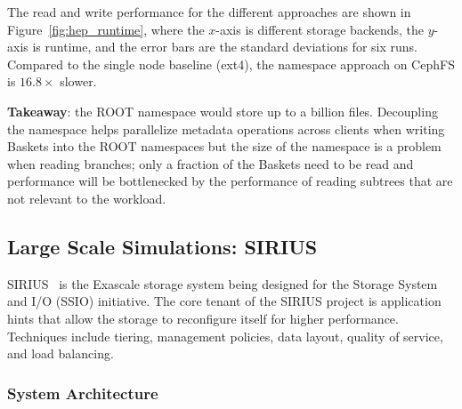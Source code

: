 
The read and write performance for the different approaches are shown in
Figure~\ref{fig:hep_runtime}, where the \(x\)-axis is different storage
backends, the \(y\)-axis is runtime, and the error bars are the standard
deviations for six runs. Compared to the single node baseline (ext4), the
namespace approach on CephFS is \(16.8\times\) slower. 

\noindent\textbf{Takeaway}: the ROOT namespace would store up to a billion
files. Decoupling the namespace helps parallelize metadata operations across
clients when writing Baskets into the ROOT namespaces but the size of the
namespace is a problem when reading branches; only a fraction of the Baskets
need to be read and performance will be bottlenecked by the performance of
reading subtrees that are not relevant to the workload.

\subsection{Large Scale Simulations: SIRIUS}

SIRIUS~\cite{klasky:journal16-sirius} is the Exascale storage system being
designed for the Storage System and I/O (SSIO) initiative. The core tenant of
the SIRIUS project is application hints that allow the storage to reconfigure
itself for higher performance. Techniques include tiering, management policies,
data layout, quality of service, and load balancing. 

\subsubsection{System Architecture}

